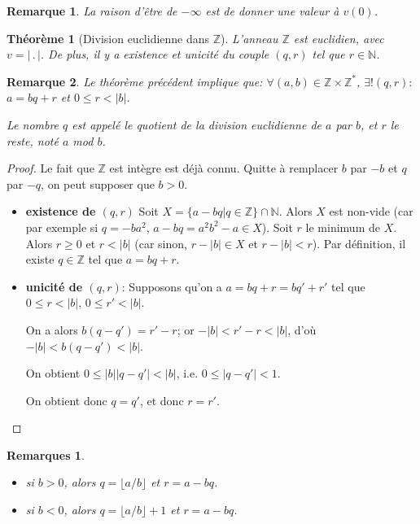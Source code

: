 \documentclass[12pt]{report}
\newtheorem{thm}{Théorème}[chapter]
\newtheorem*{rem}{Remarque}
\newtheorem*{rems}{Remarques}
\newcommand{\N}{\mathbb{N}}
\newcommand{\Z}{\mathbb{Z}}
\begin{document}
\begin{rem}
La raison d'être de $-\infty$ est de donner une valeur à $v(0)$.
\end{rem}

\begin{thm}[Division euclidienne dans $\mathbb{Z}$]
L'anneau $\mathbb{Z}$ est euclidien, avec $v=| \, . \, |$. De plus, il y a existence et unicité du couple $(q,r)$ tel que $r \in \mathbb{N}$.
\end{thm}

\begin{rem}
Le théorème précédent implique que: $\forall (a,b) \in \mathbb{Z}\times \mathbb{Z}^*$, $\exists ! (q,r):$ $a=bq+r$ et $0 \leq r < |b|$.\par 
Le nombre $q$ est appelé le quotient de la division euclidienne de $a$ par $b$, et $r$ le reste, noté $a$ mod $b$.
\end{rem}

\begin{proof}
Le fait que $\mathbb{Z}$ est intègre est déjà connu. Quitte à remplacer $b$ par $-b$ et  $q$ par $-q$, on peut supposer que $b>0$. 

\begin{itemize}

\item[$\bullet$] \textbf{existence de $(q,r)$} Soit $X=\{a-bq|q\in \Z\}\cap \N$. Alors $X$ est non-vide (car par exemple si $q=-ba^2$, $a-bq=a^2b^2-a\in X$). Soit $r$ le minimum de $X$. Alors $r\geq 0$ et $r<|b|$ (car sinon, $r-|b|\in X$ et $r-|b|<r$).  Par définition, il existe $q\in \Z$ tel que $a=bq+r$.

\item[$\bullet$] \textbf{unicité de $(q,r)$}: Supposons qu'on a $a=bq+r=bq'+r'$ tel que $0 \leq r < |b|$, $0 \leq r' < |b|$. \par 
On a alors $b(q-q')=r'-r$; or $-|b|<r'-r<|b|$, d'où $-|b|<b(q-q')<|b|$. \par 
On obtient $0 \leq |b| |q-q'|<|b|$, i.e. $0 \leq |q-q'|<1$. \par 
On obtient donc $q=q'$, et donc $r=r'$.

\end{itemize}

\end{proof}



\begin{rems}\
\begin{itemize}


\item[•] si $b>0$, alors $q=\lfloor {a}/{b} \rfloor$ et $r=a-bq$.
\item[•] si $b<0$, alors $q=\lfloor {a}/{b} \rfloor +1 $ et $r=a-bq$.
\end{itemize}
\end{rems}
\end{document}
